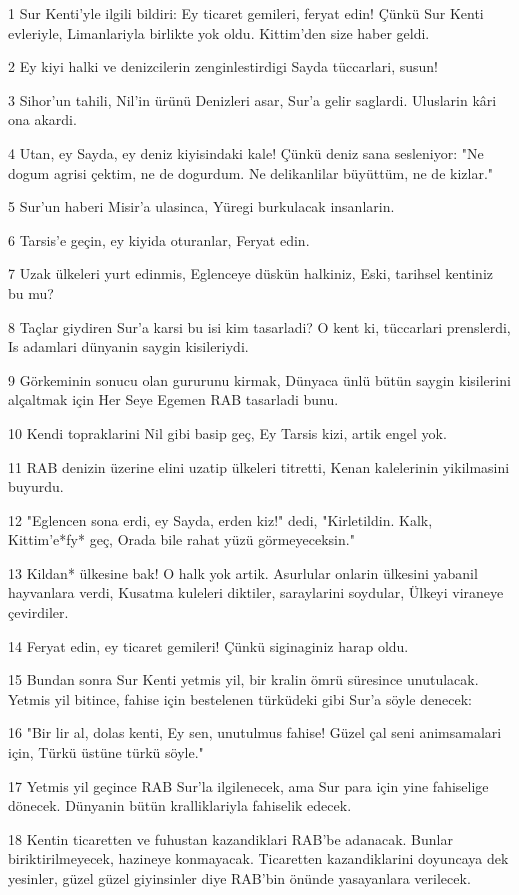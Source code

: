 \par 1 Sur Kenti'yle ilgili bildiri: Ey ticaret gemileri, feryat edin! Çünkü Sur Kenti evleriyle, Limanlariyla birlikte yok oldu. Kittim'den size haber geldi.
\par 2 Ey kiyi halki ve denizcilerin zenginlestirdigi Sayda tüccarlari, susun!
\par 3 Sihor'un tahili, Nil'in ürünü Denizleri asar, Sur'a gelir saglardi. Uluslarin kâri ona akardi.
\par 4 Utan, ey Sayda, ey deniz kiyisindaki kale! Çünkü deniz sana sesleniyor: "Ne dogum agrisi çektim, ne de dogurdum. Ne delikanlilar büyüttüm, ne de kizlar."
\par 5 Sur'un haberi Misir'a ulasinca, Yüregi burkulacak insanlarin.
\par 6 Tarsis'e geçin, ey kiyida oturanlar, Feryat edin.
\par 7 Uzak ülkeleri yurt edinmis, Eglenceye düskün halkiniz, Eski, tarihsel kentiniz bu mu?
\par 8 Taçlar giydiren Sur'a karsi bu isi kim tasarladi? O kent ki, tüccarlari prenslerdi, Is adamlari dünyanin saygin kisileriydi.
\par 9 Görkeminin sonucu olan gururunu kirmak, Dünyaca ünlü bütün saygin kisilerini alçaltmak için Her Seye Egemen RAB tasarladi bunu.
\par 10 Kendi topraklarini Nil gibi basip geç, Ey Tarsis kizi, artik engel yok.
\par 11 RAB denizin üzerine elini uzatip ülkeleri titretti, Kenan kalelerinin yikilmasini buyurdu.
\par 12 "Eglencen sona erdi, ey Sayda, erden kiz!" dedi, "Kirletildin. Kalk, Kittim'e*fy* geç, Orada bile rahat yüzü görmeyeceksin."
\par 13 Kildan* ülkesine bak! O halk yok artik. Asurlular onlarin ülkesini yabanil hayvanlara verdi, Kusatma kuleleri diktiler, saraylarini soydular, Ülkeyi viraneye çevirdiler.
\par 14 Feryat edin, ey ticaret gemileri! Çünkü siginaginiz harap oldu.
\par 15 Bundan sonra Sur Kenti yetmis yil, bir kralin ömrü süresince unutulacak. Yetmis yil bitince, fahise için bestelenen türküdeki gibi Sur'a söyle denecek:
\par 16 "Bir lir al, dolas kenti, Ey sen, unutulmus fahise! Güzel çal seni animsamalari için, Türkü üstüne türkü söyle."
\par 17 Yetmis yil geçince RAB Sur'la ilgilenecek, ama Sur para için yine fahiselige dönecek. Dünyanin bütün kralliklariyla fahiselik edecek.
\par 18 Kentin ticaretten ve fuhustan kazandiklari RAB'be adanacak. Bunlar biriktirilmeyecek, hazineye konmayacak. Ticaretten kazandiklarini doyuncaya dek yesinler, güzel güzel giyinsinler diye RAB'bin önünde yasayanlara verilecek.

